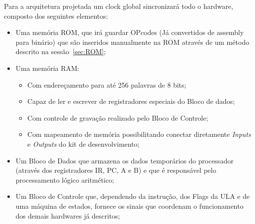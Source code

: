 \documentclass[../main.tex]{subfiles}
\begin{document}
	Para a arquitetura projetada um clock global sincronizará todo o hardware, composto dos seguintes elementos:
	\begin{itemize}
		\item Uma memória ROM, que irá guardar OPcodes (Já convertidos de assembly para binário) que são inseridos manualmente na ROM através de um método descrito na sessão~\ref{sec:ROM};
		\item Uma memória RAM:
			\begin{itemize}
				\item Com endereçamento para até 256 palavras de 8 bits; 
				\item Capaz de ler e escrever de registradores especiais do Bloco de dados; 
				\item Com controle de gravação realizado pelo Bloco de Controle;
				\item Com mapeamento de memória possibilitando conectar diretamente \textit{Inputs} e \textit{Outputs} do kit de desenvolvimento;
			\end{itemize}
		\item Um Bloco de Dados que armazena os dados temporários do processador (através dos registradores IR, PC, A e B) e que é responsável pelo processamento lógico aritmético;
		\item Um Bloco de Controle que, dependendo da instrução, dos Flags da ULA e de uma máquina de estados, fornece os sinais que coordenam o funcionamento dos demais hardwares já descritos;
	\end{itemize}
\end{document}
